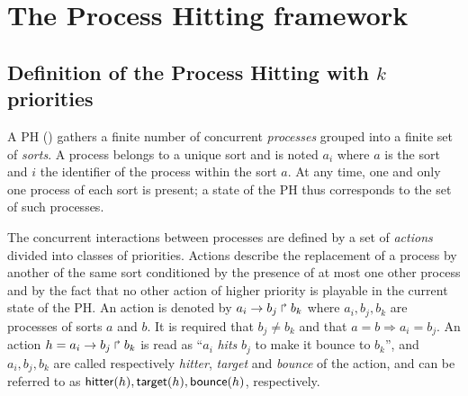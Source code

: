 \section{The Process Hitting framework}


\subsection{Definition of the Process Hitting with $k$ priorities}
\label{ssec:PH}
A PH () gathers a finite number of concurrent \emph{processes} grouped into a finite set of \emph{sorts}.
A process belongs to a unique sort and is noted $a_i$ where $a$ is the sort and $i$ the identifier of the process within the sort $a$.
At any time, one and only one process of each sort is present; a state of the PH thus corresponds to the set of such processes.

The concurrent interactions between processes are defined by a set of \emph{actions} divided into classes of priorities.
Actions describe the replacement of a process by another of the same sort conditioned by the presence of at most one other process and by the fact that no other action of higher priority is playable in the current state of the PH.
An action is denoted by $a_i\rightarrow b_j\Rsh b_k$ where $a_i,b_j,b_k$ are processes of sorts $a$ and $b$.
It is required that $b_j \neq b_k$ and that $a=b\Rightarrow a_i=b_j$.
An action $h=a_i\rightarrow b_j\Rsh b_k$ is read as ``$a_i$ \emph{hits} $b_j$ to make it bounce to $b_k$'', and $a_i,b_j,b_k$ are called respectively \emph{hitter}, \emph{target} and \emph{bounce} of the action, and can be referred to as $\mathsf{hitter}(h), \mathsf{target}(h), \mathsf{bounce}(h)$, respectively.

